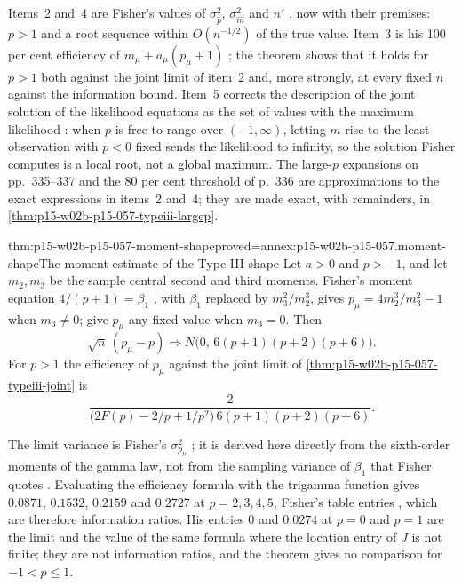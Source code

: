 Items~2 and~4 are Fisher's values of \(\sigma_{\hat p}^2\),
\(\sigma_{\hat m}^2\) and \(n'\) \cite[pp.~335--337]{Fisher1922Foundations},
now with their premises: \(p>1\) and a root sequence within
\(O(n^{-1/2})\) of the true value. Item~3 is his 100 per cent efficiency of
\(m_\mu+a_\mu(p_\mu+1)\) \cite[p.~337]{Fisher1922Foundations}; the
theorem shows that it holds for \(p>1\) both against the joint limit of
item~2 and, more strongly, at every fixed \(n\) against the information
bound. Item~5 corrects the description of the joint solution of the
likelihood equations as the set of values with the maximum likelihood
\cite[p.~335]{Fisher1922Foundations}: when \(p\) is free to range over
\((-1,\infty)\), letting \(m\) rise to the least observation with \(p<0\)
fixed sends the likelihood to infinity, so the solution Fisher computes is
a local root, not a global maximum. The large-\(p\) expansions on
pp.~335--337 and the 80 per cent threshold of p.~336 are approximations
to the exact expressions in items~2 and~4; they are made exact, with
remainders, in \cref{thm:p15-w02b-p15-057-typeiii-largep}.

\begin{hbtheorem}{thm:p15-w02b-p15-057-moment-shape}{proved=annex:p15-w02b-p15-057.moment-shape}{The moment estimate of the Type III shape}
Let \(a>0\) and \(p>-1\), and let \(m_2,m_3\) be the sample central second
and third moments. Fisher's moment equation \(4/(p+1)=\beta_1\)
\cite[p.~334]{Fisher1922Foundations}, with \(\beta_1\) replaced by
\(m_3^2/m_2^3\), gives \(p_\mu=4m_2^3/m_3^2-1\) when \(m_3\neq0\); give
\(p_\mu\) any fixed value when \(m_3=0\). Then
\[
 \sqrt n\,(p_\mu-p)\Rightarrow N\bigl(0,\,6(p+1)(p+2)(p+6)\bigr).
\]
For \(p>1\) the efficiency of \(p_\mu\) against the joint limit of
\cref{thm:p15-w02b-p15-057-typeiii-joint} is
\[
 \frac{2}{\bigl(2F(p)-2/p+1/p^2\bigr)\,6(p+1)(p+2)(p+6)} .
\]
\end{hbtheorem}

The limit variance is Fisher's \(\sigma_{p_\mu}^2\)
\cite[p.~335]{Fisher1922Foundations}; it is derived here directly from
the sixth-order moments of the gamma law, not from the sampling variance
of \(\beta_1\) that Fisher quotes \cite[p.~334]{Fisher1922Foundations}.
Evaluating the efficiency formula with the trigamma function gives
\(0.0871\), \(0.1532\), \(0.2159\) and \(0.2727\) at \(p=2,3,4,5\), Fisher's
table entries \cite[p.~336]{Fisher1922Foundations}, which are therefore
information ratios. His entries \(0\) and \(0.0274\) at \(p=0\) and
\(p=1\) are the limit and the value of the same formula where the location
entry of \(J\) is not finite; they are not information ratios, and the
theorem gives no comparison for \(-1<p\leq1\).

